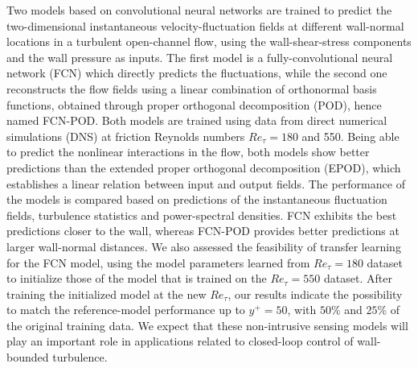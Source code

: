 {%
Two models based on convolutional neural networks are trained to predict the two-dimensional instantaneous velocity-fluctuation fields at different wall-normal locations in a turbulent open-channel flow, using the wall-shear-stress components and the wall pressure as inputs.
The first model is a fully-convolutional neural network (FCN) which directly predicts the fluctuations, while the second one reconstructs the flow fields using a linear combination of orthonormal basis functions, obtained through proper orthogonal decomposition (POD), hence named FCN-POD.
Both models are trained using data from direct numerical simulations (DNS) at friction Reynolds numbers $Re_{\tau} = 180$ and 550.
Being able to predict the nonlinear interactions in the flow, both models show better predictions than the extended proper orthogonal decomposition (EPOD), which establishes a linear relation between input and output fields.
The performance of the models is compared based on predictions of the instantaneous fluctuation fields, turbulence statistics and power-spectral densities.
FCN exhibits the best predictions closer to the wall, whereas FCN-POD provides better predictions at larger wall-normal distances.
We also assessed the feasibility of transfer learning for the FCN model, using the model parameters learned from $Re_{\tau}=180$ dataset to initialize those of the model that is trained on the $Re_{\tau}=550$ dataset.
After training the initialized model at the new $Re_{\tau}$, our results indicate the possibility to match the reference-model performance up to $y^{+}=50$, with $50\%$ and $25\%$ of the original training data.
We expect that these non-intrusive sensing models will play an important role in applications related to closed-loop control of wall-bounded turbulence.
}
%
\graphicspath{{paper2/}}%
%
%
%
